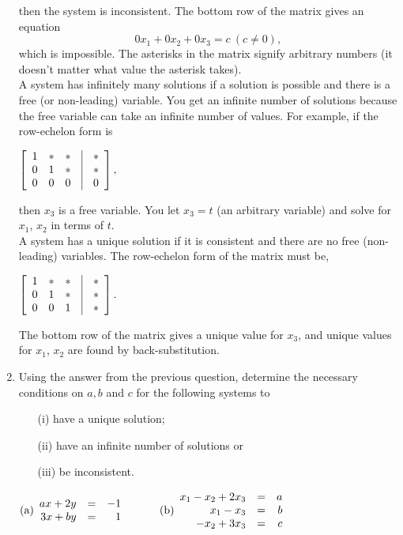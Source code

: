 \begin{enumerate}
\noindent then the system is inconsistent.  The bottom row of the
matrix gives an equation $$0x_{1}+0x_{2}+0x_{3}=c\ (c\neq0),$$
which is impossible.  The asterisks in the matrix signify
arbitrary numbers (it doesn't matter what value the asterisk
takes).
\\
\noindent A system has infinitely many solutions if a solution is
possible and there is a free (or non-leading) variable.  You get
an infinite number of solutions because the free variable can take
an infinite number of values.  For example, if the row-echelon
form is

$\left[\begin{array}{rrrcr}
                    1&*&*&\vline&*\\
                    0&1&*&\vline&*\\
                    0&0&0&\vline&0\end{array}\right],$

then $x_{3}$ is a free variable.  You let $x_{3}=t$ (an arbitrary
variable) and solve for $x_{1}$, $x_{2}$ in terms of $t$.
\\
\noindent A system has a unique solution if it is consistent and
there are no free (non-leading) variables.  The row-echelon form
of the matrix must be,


$ \left[\begin{array}{rrrcr}
                    1&*&*&\vline&*\\
                    0&1&*&\vline&*\\
                    0&0&1&\vline&*\end{array}\right].$

The bottom row of the matrix gives a unique value for $x_{3}$, and
unique values for $x_{1}$, $x_{2}$ are found by back-substitution.

\item Using the answer from the previous question,
determine the necessary conditions on $a, b$ and $c$ for the
following systems to
\begin{enumerate}
\item [(i)] have a unique solution;
\item [(ii)] have an infinite number of solutions or
\item [(iii)] be inconsistent.
\end{enumerate}

$\rm{(a)} \begin{array}{rrr} ax+2y&=&-1\\ 3x+by&=&1 \end{array}
\quad \quad \quad \rm{(b)} \begin{array}{rrr} x_1-x_2+2x_3&=&a\\
x_1-x_3&=&b\\ -x_2+3x_3&=&c \end{array}$


\end{enumerate}
